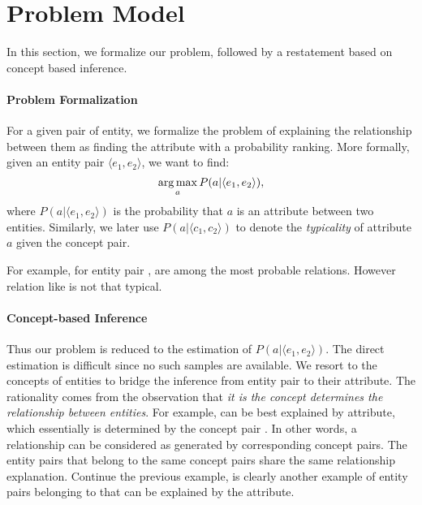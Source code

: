 
\section{Problem Model}
\label{sec:framework}
In this section, we formalize our problem, followed by a restatement based on concept based inference.
\vspace{-2mm}
\paragraph{Problem Formalization}
For a given pair of entity, we formalize the problem of explaining the relationship between them as finding the attribute with a probability ranking.
More formally, given an entity pair $ \langle e_1, e_2 \rangle $, we want to find:
\begin{equation}
\operatorname*{arg\,max}_a P(a|\langle e_1,e_2 \rangle),
\end{equation}
where $P(a| \langle e_1, e_2 \rangle )$ is the probability that $a$ is an attribute between two entities. Similarly, we later use $P(a| \langle c_{1},c_{2} \rangle )$ to denote the {\it typicality} of attribute $a$ given the concept pair.

For example, for entity pair ,  are among the most probable relations.
However relation like  is not that typical. 

\vspace{-2mm}
\paragraph{Concept-based Inference}
Thus our problem is reduced to the estimation of $P(a| \langle e_1, e_2 \rangle )$.
The direct estimation is difficult since no such samples are available.
We resort to the concepts of entities to bridge the inference from entity pair to their attribute.
The rationality comes from the observation that {\it it is the concept determines the relationship between entities}. For example,  can be best explained by  attribute, which essentially is determined by the concept pair .
In other words, a relationship can be considered as generated by corresponding concept pairs.
The entity pairs that belong to the same concept pairs share the same relationship explanation.
Continue the previous example,  is clearly another example of entity pairs belonging to  that can be explained by the  attribute.

